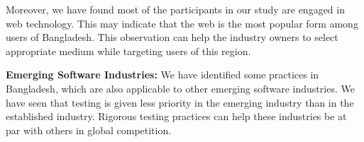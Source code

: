 Moreover, we have found most of the participants in our study are engaged in web technology. This may indicate that the web is the most popular form among users of Bangladesh. This observation can help the industry owners to select appropriate medium while targeting users of this region. %


\indent \textbf{Emerging Software Industries:} We have identified some practices in Bangladesh, which are also applicable to other emerging software industries. We have seen that testing is given less priority in the emerging industry than in the established industry. Rigorous testing practices can help these industries be at par with others in global competition.
